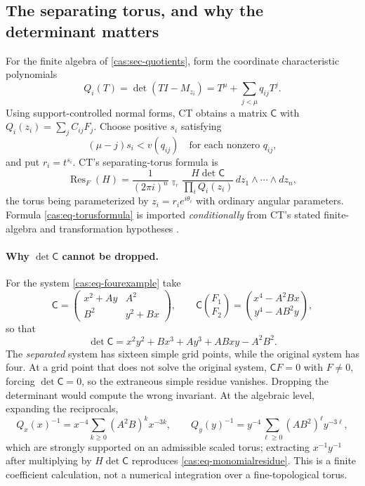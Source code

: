 \documentclass[11pt,letterpaper]{article}
\numberwithin{equation}{section}
\theoremstyle{definition}
\theoremstyle{remark}
\newcommand{\Res}{\operatorname{Res}}
\newcommand{\HInt}{\mathop{\int^{\!H}}\nolimits}
\begin{document}
\subsection{The separating torus, and why the determinant matters}
\label{cas:sub-torus}
For the finite algebra of \cref{cas:sec-quotients}, form the coordinate
characteristic polynomials
\[
 Q_i(T)=\det(TI-M_{z_i})=T^\mu+\sum_{j<\mu}q_{ij}T^j .
\]
Using support-controlled normal forms, CT obtains a matrix $\mathsf C$ with
$Q_i(z_i)=\sum_jC_{ij}F_j$. Choose positive $s_i$ satisfying
\begin{equation}\label{cas:eq-radiusineq}
 (\mu-j)s_i<v(q_{ij})\quad\text{for each nonzero }q_{ij},
\end{equation}
and put $r_i=t^{s_i}$. CT's separating-torus formula is
\begin{equation}\label{cas:eq-torusformula}
 \Res_F(H)=\frac{1}{(2\pi i)^n}\HInt_{\mathbb T_r}
 \frac{H\det\mathsf C}{\prod_iQ_i(z_i)}\,dz_1\wedge\cdots\wedge dz_n ,
\end{equation}
the torus being parameterized by $z_i=r_ie^{i\theta_i}$ with ordinary angular
parameters. Formula \eqref{cas:eq-torusformula} is imported \emph{conditionally}
from CT's stated finite-algebra and transformation hypotheses
\cite{cas:SourceCT}.

\paragraph{Why $\det\mathsf C$ cannot be dropped.}
For the system \eqref{cas:eq-fourexample} take
\[
 \mathsf C=\begin{pmatrix}x^2+Ay&A^2\\B^2&y^2+Bx\end{pmatrix},
 \qquad
 \mathsf C\binom{F_1}{F_2}=\binom{x^4-A^2Bx}{y^4-AB^2y},
\]
so that
\begin{equation}\label{cas:eq-detC}
 \det\mathsf C=x^2y^2+Bx^3+Ay^3+ABxy-A^2B^2 .
\end{equation}
The \emph{separated} system has sixteen simple grid points, while the original
system has four. At a grid point that does not solve the original system,
$\mathsf CF=0$ with $F\ne0$, forcing $\det\mathsf C=0$, so the extraneous simple
residue vanishes. Dropping the determinant would compute the wrong invariant.
At the algebraic level, expanding the reciprocals,
\[
 Q_x(x)^{-1}=x^{-4}\sum_{k\ge0}(A^2B)^kx^{-3k},\qquad
 Q_y(y)^{-1}=y^{-4}\sum_{\ell\ge0}(AB^2)^\ell y^{-3\ell},
\]
which are strongly supported on an admissible scaled torus; extracting
$x^{-1}y^{-1}$ after multiplying by $H\det\mathsf C$ reproduces
\eqref{cas:eq-monomialresidue}. This is a finite coefficient calculation, not a
numerical integration over a fine-topological torus.
\end{document}
